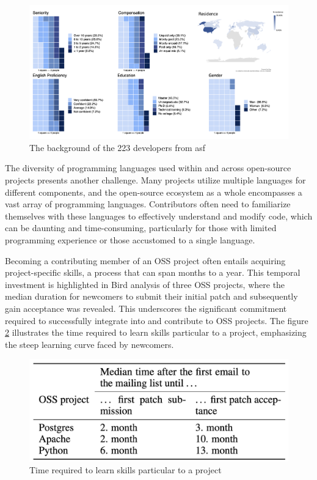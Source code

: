 \begin{figure}[ht]
    \centering
    \includegraphics[width=1\linewidth]{figs/contributor_background.png}
    \caption{The background of the 223 developers from \ac{asf} \cite{04guizani2021long}}
    \label{fig:contributor_background}
\end{figure}

The diversity of programming languages used within and across open-source projects presents another challenge. Many projects utilize multiple languages for different components, and the open-source ecosystem as a whole encompasses a vast array of programming languages. Contributors often need to familiarize themselves with these languages to effectively understand and modify code, which can be daunting and time-consuming, particularly for those with limited programming experience or those accustomed to a single language.


Becoming a contributing member of an OSS project often entails acquiring project-specific skills, a process that can span months to a year. This temporal investment is highlighted in Bird \cite{bird2007open} analysis of three OSS projects, where the median duration for newcomers to submit their initial patch and subsequently gain acceptance was revealed. This underscores the significant commitment required to successfully integrate into and contribute to OSS projects. The figure \ref{fig:timeskill} illustrates the time required to learn skills particular to a project, emphasizing the steep learning curve faced by newcomers.

\begin{figure}[ht]
    \centering
    \includegraphics[width=0.65\linewidth]{figs/timeskill.png}
    \caption{Time required to learn skills particular to a project \cite{bird2007open}}
    \label{fig:timeskill}
\end{figure}

